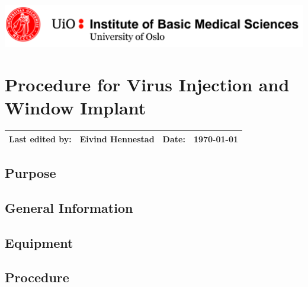 \newpage

\thispagestyle{ft}

\hfill\includegraphics[width=0.8\linewidth]{imb_logo.png}

\section{Procedure for \textbf{Virus Injection and Window Implant}}

\vspace{3mm}
\begin{tabular*}{\linewidth}{| @{\extracolsep{\fill} } llll|}
\hline
Last edited by: & Eivind Hennestad & Date: & \today \\
\hline
\end{tabular*}

\subsection{Purpose}

\subsection{General Information}

\subsection{Equipment}

\subsection{Procedure}

